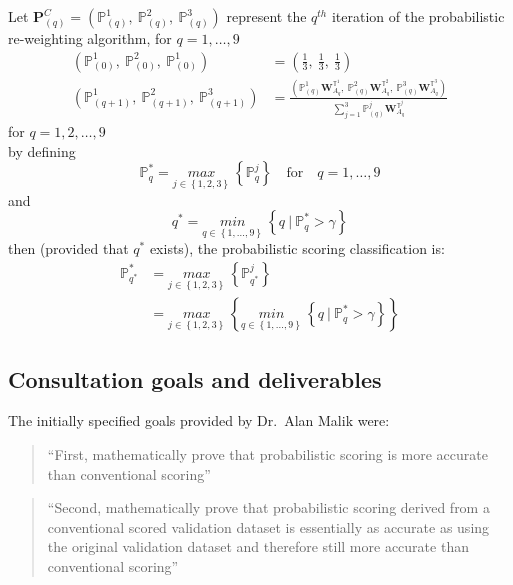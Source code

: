 \documentclass[12pt,]{article}
\begin{document}
Let
\(\mathbf{P}_{(q)}^{C}=\left(\mathbb{P}_{(q)}^{1}, \ \mathbb{P}_{(q)}^{2}, \ \mathbb{P}_{(q)}^{3} \right)\)
represent the \(q^{th}\) iteration of the probabilistic re-weighting
algorithm, for \(q=1, \ldots, 9\) \begin{align*}
\left(\mathbb{P}_{(0)}^{1}, \ \mathbb{P}_{(0)}^{2}, \ \mathbb{P}_{(0)}^{1} \right) &= \left( \frac{1}{3}, \  \frac{1}{3}, \ \frac{1}{3}\right) \\[0.5em]
    \left(\mathbb{P}_{(q+1)}^{1}, \ \mathbb{P}_{(q+1)}^{2}, \ \mathbb{P}_{(q+1)}^{3} \right) &= \frac{\left(\mathbb{P}_{(q)}^{1}\mathbf{W}_{A_{q}}^{\mathbb{T}^{1}}, \ \mathbb{P}_{(q)}^{2}\mathbf{W}_{A_{q}}^{\mathbb{T}^{2}}, \ \mathbb{P}_{(q)}^{3}\mathbf{W}_{A_{q}}^{\mathbb{T}^{3}} \right) }{\sum_{j=1}^{3} \mathbb{P}_{(q)}^{j}\mathbf{W}_{A_{q}}^{\mathbb{T}^{j}}} \tag{EQ: 1.3.2-2} \label{EQ: 1.3.2-2}
\end{align*} for \(q=1, 2, \ldots, 9\)\\
by defining
\[\mathbb{P}_{q}^{*}= \underset{j \in \left \{1, 2, 3 \right \}}{max} \ \left \{ \mathbb{P}_{q}^{j} \right \} \quad \text{for} \quad q=1, \ldots, 9\]
and
\[q^{*}=\underset{q \in \left \{1, \ldots, 9 \right \}}{min} \ \left \{q \ \Big | \ \mathbb{P}^{*}_{q} > \gamma \right \}\]
then (provided that \(q^{*}\) exists), the probabilistic scoring
classification is: \begin{align*}
\mathbb{P}_{q^{*}}^{*} &= \underset{j \in \left \{1, 2, 3 \right \}}{max} \ \left \{ \mathbb{P}_{q^{*}}^{j} \right \} \\[0.5em]
&= \underset{j \in \left \{1, 2, 3 \right \}}{max} \ \left \{ \underset{q \in \left \{1, \ldots, 9 \right \}}{min} \ \left \{q \ \Big | \ \mathbb{P}^{*}_{q} > \gamma \right \} \right \}
\end{align*}

\hypertarget{consultation-goals-and-deliverables}{%
\subsection{Consultation goals and
deliverables}\label{consultation-goals-and-deliverables}}

The initially specified goals provided by Dr.~Alan Malik were:

\begin{quote}
``First, mathematically prove that probabilistic scoring is more
accurate than conventional scoring''
\end{quote}

\begin{quote}
``Second, mathematically prove that probabilistic scoring derived from a
conventional scored validation dataset is essentially as accurate as
using the original validation dataset and therefore still more accurate
than conventional scoring''
\end{quote}
\end{document}
